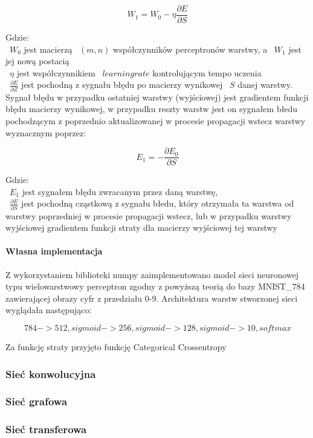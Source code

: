 \documentclass{article}
\begin{document}
$$ W_1 = W_0 - \eta \frac{\partial E}{\partial S} $$


Gdzie: \\
~$W_0$ jest macierzą ~$(m, n)$ współczynników perceptronów warstwy, a ~$W_1$ jest jej nową postacią\\
~$\eta$ jest współczynnikiem ~$learning rate$ kontrolującym tempo uczenia\\
~$\frac{\partial E}{\partial Z}$ jest pochodną z sygnału błędu po macierzy wynikowej ~$S$ danej warstwy. Sygnał błędu w przypadku ostatniej warstwy (wyjściowej) jest
gradientem funkcji błędu macierzy wynikowej, w przypadku reszty warstw jest on sygnałem błedu pochodzącym z poprzednio aktualizowanej w procesie propagacji wstecz warstwy
wyznacznym poprzez:


$$ E_1 = -\frac{\partial E_0}{\partial S} $$

Gdzie:\\
~$E_1$ jest sygnałem błędu zwracanym przez daną warstwę,\\
~$\frac{\partial E}{\partial S}$ jest pochodną cząstkową z sygnału błedu, który otrzymała ta warstwa od warstwy poprzedniej w procesie propagacji wstecz, lub w przypadku warstwy
wyjściowej gradientem funkcji straty dla macierzy wyjściowej tej warstwy\\



\paragraph{Własna implementacja}
Z wykorzystaniem biblioteki numpy zaimplementowano model sieci neuronowej typu wielowarstwowy perceptron zgodny z powyższą teorią do bazy MNIST_784 zawierającej 
obrazy cyfr z przedziału 0-9. 
Architektura warstw stworzonej sieci wyglądała następująco:

$$ 784 -> 512, sigmoid -> 256, sigmoid -> 128, sigmoid ->10, softmax$$

Za funkcję straty przyjęto funkcję Categorical Crossentropy 




\subsubsection{Sieć konwolucyjna}
\subsubsection{Sieć grafowa}
\subsubsection{Sieć transferowa}
\end{document}
